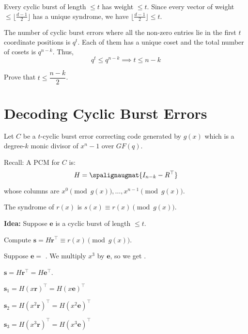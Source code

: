 \begin{Proof}{}{}
    Every cyclic burst of length $ \leqslant t $ has weight $ \leqslant t $.
    Since every vector of weight $ \leqslant \lfloor \frac{d-1}{2} \rfloor $
    has a unique syndrome, we have $ \lfloor \frac{d-1}{2} \rfloor \leqslant t $.

    The number of cyclic burst errors where all the non-zero entries lie in the first
    $ t $ coordinate positions is $ q^t $. Each of them has a unique coset
    and the total number of cosets is $ q^{n-k} $. Thus,
    \[ q^t\leqslant q^{n-k}\implies t\leqslant n-k \]
\end{Proof}

\begin{Exercise}{}{}
    Prove that $ t\leqslant \dfrac{n-k}{2} $.
\end{Exercise}

\section{Decoding Cyclic Burst Errors}
Let $ C $ be a $ t $-cyclic burst error correcting code generated
by $ g(x) $ which is a degree-$ k $ monic divisor of $ x^n-1 $ over $ GF(q) $.

Recall: A PCM for $ C $ is:
\[ H= \spalignaugmat{I_{n-k} -R^\top} \]

whose columns are $ x^0 \pmod{g(x)},\ldots ,x^{n-1} \pmod{g(x)} $.

The syndrome of $ r(x) $ is $ s(x)\equiv r(x)\pmod{g(x)} $.

\textbf{Idea:} Suppose $ \symbf{e} $ is a cyclic burst of length $ \leqslant t $.

Compute $ \symbf{s}=H\symbf{r}^\top\equiv r(x)\pmod{g(x)} $.

Suppose $ \symbf{e}= $ . We multiply $ x^3 $ by $ \symbf{e} $,
so we get .

$ \symbf{s}=H\symbf{r}^\top=H\symbf{e}^\top $.

$ \symbf{s}_1=H(x\symbf{r})^\top = H(x\symbf{e})^\top $

$ \symbf{s}_2=H(x^2\symbf{r})^\top = H(x^2\symbf{e})^\top $

$ \symbf{s}_3=H(x^3\symbf{r})^\top = H(x^3\symbf{e})^\top $
